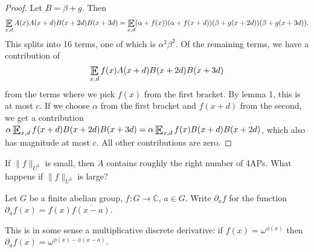 \documentclass{article}
\DeclareMathOperator*{\E}{\scalerel*{\mathbb{E}}{\textstyle\sum}}
\newcommand{\1}[1]{\mathbbm{1}_{#1}}
\begin{document}
\begin{proof}
  Let $B = \beta + g$. Then
  \begin{align*}
    \E_{x,d} A(x) A(x+d) B(x+2d) B(x+3d) = \E_{x,d} (\alpha+f(x)) (\alpha + f(x+d)) (\beta+g(x+2d))(\beta + g(x+3d)).
  \end{align*}
  This splits into 16 terms, one of which is $\alpha^2 \beta^2$.
  Of the remaining terms, we have a contribution of
  \begin{equation*}
    \E_{x,d} f(x) A(x+d) B(x+2d) B(x+3d)
  \end{equation*}
  from the terms where we pick $f(x)$ from the first bracket.
  By lemma 1, this is at most $c$. If we choose $\alpha$ from the first bracket and $f(x+d)$ from the second, we get a contribution $\alpha \E_{x,d} f(x+d) B(x+2d) B(x+3d) = \alpha \E_{x,d} f(x) B(x+d) B(x+2d)$, which also has magnitude at most $c$. All other contributions are zero.
\end{proof}

If $\|f\|_{U^3}$ is small, then $A$ contains roughly the right number of 4APs.
What happens if $\|f\|_{U^3}$ is large?
\begin{defi}
  Let $G$ be a finite abelian group, $f: G \to \mathbb{C}$, $a \in G$.
  Write $\partial_a f$ for the function $\partial_a f(x) = f(x) \overline{f(x-a)}$.
\end{defi}
This is in some sense a multiplicative discrete derivative: if $f(x) = \omega^{\phi(x)}$ then $\partial_a f(x) = \omega^{\phi(x) - \phi(x-a)}$.
\end{document}
